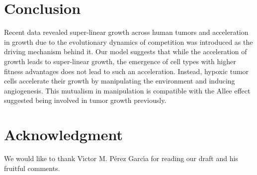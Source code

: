 \documentclass[aps,prl, superscriptaddress,groupedaddress]{revtex4}  %
\begin{document}
	
	\section{Conclusion}
	Recent data revealed super-linear growth across human tumors and acceleration in growth due to the evolutionary dynamics of competition was introduced as the driving mechanism behind it. Our model suggests that while the acceleration of growth leads to super-linear growth, the emergence of cell types with higher fitness advantages does not lead to such an acceleration. Instead, hypoxic tumor cells accelerate their growth by manipulating the environment and inducing angiogenesis. This mutualism in manipulation is compatible with the Allee effect suggested being involved in tumor growth previously.
	
	\section{Acknowledgment} We would like to thank V\'{\i}ctor M. P\'erez Garc\'{\i}a for reading our draft and his fruitful comments.
 
\end{document}
